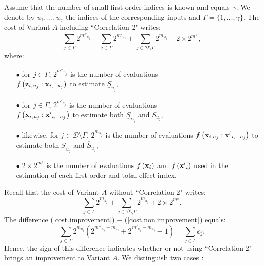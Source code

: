 Assume that the number of small first-order indices is known and equals $\gamma$. We denote by $u_1,\dots,u_{\gamma}$ the indices of the corresponding inputs and $\Gamma = \{1,\dots,\gamma\}$. The cost of Variant $A$ including ``Correlation 2" writes: 
\begin{equation}
\sum \limits_{j \in \Gamma} 2^{m''_{u_j}} + \sum \limits_{j \in \Gamma} 2^{m'_{u_j}} + \sum \limits_{j \in \mathcal{D}\setminus{\Gamma}} 2^{m_{u_j}} + 2 \times 2^{m^\star},
\label{cost.improvement}
\end{equation}
where: %
\begin{itemize}
\item[$\bullet$] for $j\in \Gamma$, $2^{m''_{u_j}}$ is the number of evaluations \\ $f\left(\boldsymbol{\mathbf{z}}_{i,u_j}:\boldsymbol{\mathbf{x}}_{i,-u_j}\right)$ to estimate $\underline{S}_{u_j}$,
\item[$\bullet$] for $j\in \Gamma$, $2^{m'_{u_j}}$ is the number of evaluations \\ $f\left(\boldsymbol{\mathbf{x}}_{i,u_j}:{\boldsymbol{\mathbf{x}}'}_{i,-u_j}\right)$ to estimate both $\underline{S}_{u_j}$ and  $\overline{S}_{u_j}$,
\item[$\bullet$] likewise, for $j\in \mathcal{D}\setminus{\Gamma}$, $ 2^{m_{u_j}}$ is the number of evaluations $f\left(\boldsymbol{\mathbf{x}}_{i,u_j}:{\boldsymbol{\mathbf{x}}'}_{i,-u_j}\right)$ to estimate both $\underline{S}_{u_j}$ and  $\overline{S}_{u_j}$,
\item[$\bullet$] $2 \times 2^{m^{\star}}$ is the number of evaluations $f\left(\boldsymbol{\mathbf{x}}_{i}\right)$ and $f\left({\boldsymbol{\mathbf{x}}'}_{i}\right)$ used in the estimation of each first-order and total effect index.
\end{itemize}
Recall that the cost of Variant $A$ without  ``Correlation 2" writes:
\begin{equation}
\sum \limits_{j \in \Gamma} 2^{m_{u_j}} + \sum \limits_{j \in \mathcal{D}\setminus{\Gamma}} 2^{m_{u_j}} + 2 \times 2^{m^{\star}}. 
\label{cost.non.improvement}
\end{equation}
The difference (\ref{cost.improvement}) $-$ (\ref{cost.non.improvement}) equals:
\begin{equation}
 \sum \limits_{j \in \Gamma} 2^{m_{u_j}} \left(2^{m''_{u_j}-m_{u_j}}  + 2^{m'_{u_j}-m_{u_j}} - 1 \right) = \sum \limits_{j \in \Gamma} c_j.
\label{cost.comparison}
\end{equation}
Hence, the sign of this difference indicates whether or not using ``Correlation 2" brings an improvement to Variant $A$. We distinguish two cases :
